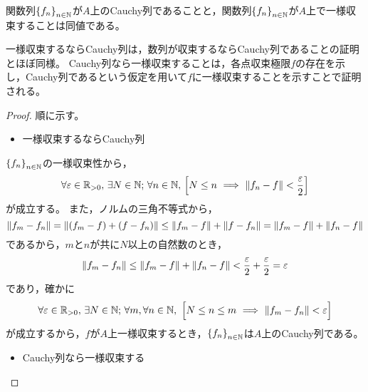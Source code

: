 \documentclass[b5paper,draft]{ltjsbook}
\begin{document}
\begin{thm}[一様収束性とCauchy列の同値性]
    関数列$\seq{f_n}{n\in\N}$が$A$上のCauchy列であることと，関数列$\seq{f_n}{n\in\N}$が$A$上で一様収束することは同値である。
    \begin{policy}
        一様収束するならCauchy列は，数列が収束するならCauchy列であることの証明とほぼ同様。
        Cauchy列なら一様収束することは，各点収束極限$f$の存在を示し，Cauchy列であるという仮定を用いて$f$に一様収束することを示すことで証明される。
    \end{policy}
    \begin{proof}
        順に示す。
        \begin{itemize}
            \item 一様収束するならCauchy列
        \end{itemize}

        $\seq{f_n}{n\in\N}$の一様収束性から，
        \begin{equation}
            \forall\varepsilon\in\Rposi,\,\exists N\in\N;\, \forall n\in\N,\, \squ{
                N\leq n\ \Longrightarrow\ \norm{f_n-f}<\frac{\varepsilon}{2}
            }
        \end{equation}
        が成立する。
        また，ノルムの三角不等式から，
        \begin{equation}
            \norm{f_m-f_n}=\norm{\pare{f_m - f} + \pare{f-f_n}}\leq \norm{f_m-f}+\norm{f-f_n}=\norm{f_m-f}+\norm{f_n-f}
        \end{equation}
        であるから，$m$と$n$が共に$N$以上の自然数のとき，
        \begin{equation}
            \norm{f_m-f_n}\leq \norm{f_m-f}+\norm{f_n-f} <\frac{\varepsilon}{2}+\frac{\varepsilon}{2}=\varepsilon
        \end{equation}
        であり，確かに
        \begin{equation}
            \forall\varepsilon\in\Rposi,\,\exists N\in\N;\, \forall m,\forall n\in\N,\ \bsqu{
                N\leq n\leq m\ \Longrightarrow\ \norm{f_m-f_n}<\varepsilon
            }
        \end{equation}
        が成立するから，$f$が$A$上一様収束するとき，$\seq{f_n}{n\in\N}$は$A$上のCauchy列である。

        \begin{itemize}
            \item Cauchy列なら一様収束する
        \end{itemize}
        

\end{proof}
\end{thm}
\end{document}

